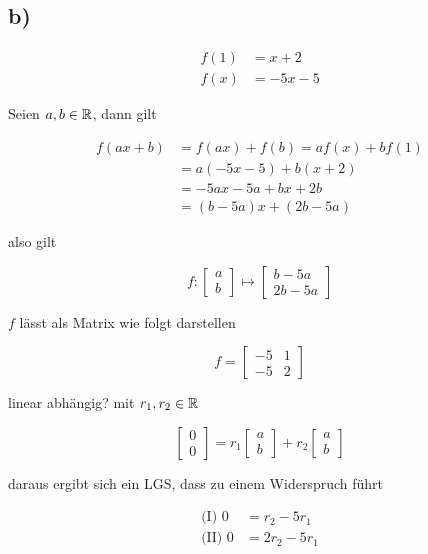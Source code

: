 \documentclass[a4paper, 11pt]{article}
\begin{document}
\subsection{b)}
\label{sec:orgab012ee}
\begin{align*}
    f(1) &= x + 2 \\
    f(x) &= -5x -5
\end{align*}

Seien \(a, b \in \mathbb{R}\), dann gilt

\begin{align*}
    f(ax + b) &= f(ax) + f(b) = a f(x) + b f(1) \\
    &= a(-5x - 5) + b(x + 2) \\
    &= -5ax - 5a + bx + 2b \\
    &= (b - 5a)x + (2b - 5a)
\end{align*}

also gilt

$$ f: \begin{bmatrix} a \\ b \end{bmatrix} \mapsto
    \begin{bmatrix} b - 5a \\ 2b - 5a \end{bmatrix} $$

\(f\) lässt als Matrix wie folgt darstellen

$$ f = \begin{bmatrix} -5 & 1 \\ -5 & 2 \end{bmatrix} $$

linear abhängig? mit \(r_1, r_2 \in \mathbb{R}\)

$$ \begin{bmatrix} 0 \\ 0 \end{bmatrix} =
    r_1 \begin{bmatrix} a \\ b \end{bmatrix} +
    r_2 \begin{bmatrix} a \\ b \end{bmatrix} $$

daraus ergibt sich ein LGS, dass zu einem Widerspruch führt

\begin{align*}
    \text{(I) } 0 &= r_2 - 5r_1 \\
    \text{(II) } 0 &= 2r_2 - 5r_1 \\
\end{align*}
\end{document}

